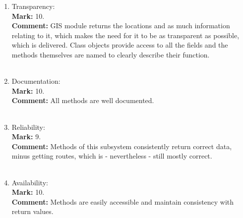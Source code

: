 \documentclass[12pt]{article}
\begin{document}
\begin{enumerate}
    \item Transparency:\\
    \textbf{Mark: }
    10.\\
    \textbf{Comment:}
    GIS module returns the locations and as much information relating to it, which makes the need for it to be as transparent as possible, which is delivered. Class objects provide access to all the fields and the methods themselves are named to clearly describe their function.\\ \\
    
    \item Documentation:\\
    \textbf{Mark: }
    10.\\
    \textbf{Comment:}
    All methods are well documented.\\ \\
    
    \item Reliability:\\
    \textbf{Mark: }
    9.\\
    \textbf{Comment:}
    Methods of this subsystem consistently return correct data, minus getting routes, which is - nevertheless - still mostly correct.\\ \\
    
    \item Availability:\\
    \textbf{Mark: }
    10.\\
    \textbf{Comment:}
    Methods are easily accessible and maintain consistency with return values.\\ \\
\end{enumerate}
\end{document}
